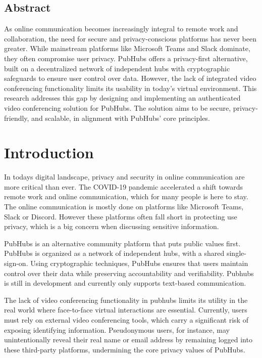 \documentclass{report}
\begin{document}
\section*{Abstract}
As online communication becomes increasingly integral to remote work and collaboration, the need for secure and
privacy-conscious platforms has never been greater. While mainstream platforms like Microsoft Teams and Slack
dominate, they often compromise user privacy. PubHubs offers a  privacy-first alternative, built on a decentralized
network of independent hubs with cryptographic safeguards to ensure user control over data. However, the lack of
integrated video conferencing functionality limits its usability in today’s virtual environment. This research
addresses this gap by designing and implementing an authenticated video conferencing solution for PubHubs. The
solution aims to be secure, privacy-friendly, and scalable, in alignment with PubHubs’ core principles.


\tableofcontents
\chapter{Introduction}
In todays digital landscape, privacy and security in online communication are more critical than ever.
The COVID-19 pandemic accelerated a shift towards remote work and online communication, which for many people is here to stay.
The online communication is mostly done on platforms like Microsoft Teams, Slack or Discord.
However these platforms often fall short in protecting use privacy, which is a big concern when discussing sensitive
information.

PubHubs is an alternative community platform that puts public values first.
PubHubs is organized as a network of independent hubs, with a shared single-sign-on.
Using cryptographic techniques, PubHubs ensures that users maintain control over their data while preserving
accountability and verifiability. Pubhubs is still in development and currently only supports text-based communication.

The lack of video conferencing functionality in pubhubs limits its utility in the real world where face-to-face
virtual interactions are essential. Currently, users must rely on external video conferencing tools, which carry a
significant risk of exposing identifying information. Pseudonymous users, for instance, may unintentionally reveal
their real name or email address by remaining logged into these third-party platforms, undermining the core privacy
values of PubHubs.
\end{document}
